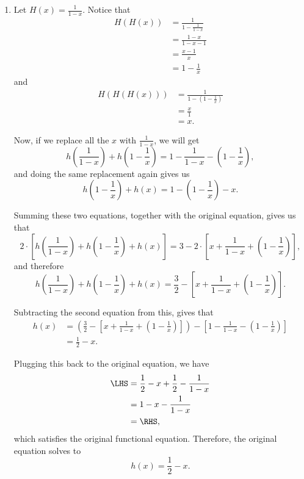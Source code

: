 \begin{enumerate}
    \item Let \(H(x) = \frac{1}{1 - x}\). Notice that
          \begin{align*}
              H(H(x)) & = \frac{1}{1 - \frac{1}{1 - x}} \\
                      & = \frac{1 - x}{1 - x - 1}       \\
                      & = \frac{x - 1}{x}               \\
                      & = 1 - \frac{1}{x}
          \end{align*}
          and
          \begin{align*}
              H(H(H(x))) & = \frac{1}{1 - \left(1 - \frac{1}{x}\right)} \\
                         & = \frac{x}{1}                                \\
                         & = x.
          \end{align*}

          Now, if we replace all the \(x\) with \(\frac{1}{1 - x}\), we will get
          \[
              h\left(\frac{1}{1 - x}\right) + h\left(1 - \frac{1}{x}\right) = 1 - \frac{1}{1 - x} - \left(1 - \frac{1}{x}\right),
          \]
          and doing the same replacement again gives us
          \[
              h\left(1 - \frac{1}{x}\right) + h(x) = 1 - \left(1 - \frac{1}{x}\right) - x.
          \]

          Summing these two equations, together with the original equation, gives us that
          \[
              2 \cdot \left[h\left(\frac{1}{1 - x}\right) + h\left(1 - \frac{1}{x}\right) + h(x)\right] = 3 - 2 \cdot \left[x + \frac{1}{1 - x} + \left(1 - \frac{1}{x}\right)\right],
          \]
          and therefore
          \[
              h\left(\frac{1}{1 - x}\right) + h\left(1 - \frac{1}{x}\right) + h(x) = \frac{3}{2} - \left[x + \frac{1}{1 - x} + \left(1 - \frac{1}{x}\right)\right].
          \]

          Subtracting the second equation from this, gives that
          \begin{align*}
              h(x) & = \left(\frac{3}{2} - \left[x + \frac{1}{1 - x} + \left(1 - \frac{1}{x}\right)\right]\right) - \left[1 - \frac{1}{1 - x} - \left(1 - \frac{1}{x}\right)\right] \\
                   & =\frac{1}{2} - x.
          \end{align*}

          Plugging this back to the original equation, we have
          \begin{align*}
              \LHS & = \frac{1}{2} - x + \frac{1}{2} - \frac{1}{1 - x} \\
                   & = 1 - x - \frac{1}{1 - x}                         \\
                   & = \RHS,
          \end{align*}
          which satisfies the original functional equation. Therefore, the original equation solves to \[h(x) = \frac{1}{2} - x.\]
\end{enumerate}